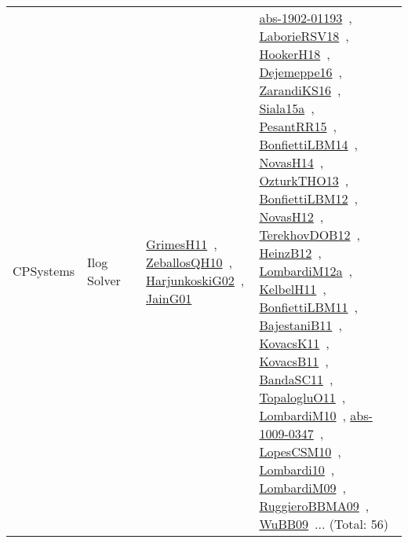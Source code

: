 {\begin{longtable}{lp{3cm}>{\raggedright\arraybackslash}p{6cm}>{\raggedright\arraybackslash}p{6cm}>{\raggedright\arraybackslash}p{8cm}}
CPSystems & Ilog Solver &  & \href{works/GrimesH11.pdf}{GrimesH11}~\cite{GrimesH11}, \href{works/ZeballosQH10.pdf}{ZeballosQH10}~\cite{ZeballosQH10}, \href{works/HarjunkoskiG02.pdf}{HarjunkoskiG02}~\cite{HarjunkoskiG02}, \href{works/JainG01.pdf}{JainG01}~\cite{JainG01} & \href{works/abs-1902-01193.pdf}{abs-1902-01193}~\cite{abs-1902-01193}, \href{works/LaborieRSV18.pdf}{LaborieRSV18}~\cite{LaborieRSV18}, \href{works/HookerH18.pdf}{HookerH18}~\cite{HookerH18}, \href{works/Dejemeppe16.pdf}{Dejemeppe16}~\cite{Dejemeppe16}, \href{works/ZarandiKS16.pdf}{ZarandiKS16}~\cite{ZarandiKS16}, \href{works/Siala15a.pdf}{Siala15a}~\cite{Siala15a}, \href{works/PesantRR15.pdf}{PesantRR15}~\cite{PesantRR15}, \href{works/BonfiettiLBM14.pdf}{BonfiettiLBM14}~\cite{BonfiettiLBM14}, \href{works/NovasH14.pdf}{NovasH14}~\cite{NovasH14}, \href{works/OzturkTHO13.pdf}{OzturkTHO13}~\cite{OzturkTHO13}, \href{works/BonfiettiLBM12.pdf}{BonfiettiLBM12}~\cite{BonfiettiLBM12}, \href{works/NovasH12.pdf}{NovasH12}~\cite{NovasH12}, \href{works/TerekhovDOB12.pdf}{TerekhovDOB12}~\cite{TerekhovDOB12}, \href{works/HeinzB12.pdf}{HeinzB12}~\cite{HeinzB12}, \href{works/LombardiM12a.pdf}{LombardiM12a}~\cite{LombardiM12a}, \href{works/KelbelH11.pdf}{KelbelH11}~\cite{KelbelH11}, \href{works/BonfiettiLBM11.pdf}{BonfiettiLBM11}~\cite{BonfiettiLBM11}, \href{works/BajestaniB11.pdf}{BajestaniB11}~\cite{BajestaniB11}, \href{works/KovacsK11.pdf}{KovacsK11}~\cite{KovacsK11}, \href{works/KovacsB11.pdf}{KovacsB11}~\cite{KovacsB11}, \href{works/BandaSC11.pdf}{BandaSC11}~\cite{BandaSC11}, \href{works/TopalogluO11.pdf}{TopalogluO11}~\cite{TopalogluO11}, \href{works/LombardiM10.pdf}{LombardiM10}~\cite{LombardiM10}, \href{works/abs-1009-0347.pdf}{abs-1009-0347}~\cite{abs-1009-0347}, \href{works/LopesCSM10.pdf}{LopesCSM10}~\cite{LopesCSM10}, \href{works/Lombardi10.pdf}{Lombardi10}~\cite{Lombardi10}, \href{works/LombardiM09.pdf}{LombardiM09}~\cite{LombardiM09}, \href{works/RuggieroBBMA09.pdf}{RuggieroBBMA09}~\cite{RuggieroBBMA09}, \href{works/WuBB09.pdf}{WuBB09}~\cite{WuBB09}... (Total: 56)\\

\end{longtable}}
